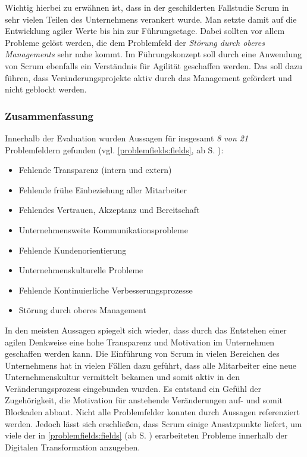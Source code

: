 Wichtig hierbei zu erwähnen ist, dass in der geschilderten Fallstudie Scrum in sehr vielen Teilen des Unternehmens verankert wurde. Man setzte damit auf die Entwicklung agiler Werte bis hin zur Führungsetage. Dabei sollten vor allem Probleme gelöst werden, die dem Problemfeld der \textit{Störung durch oberes Managements} sehr nahe kommt. Im Führungskonzept soll durch eine Anwendung von Scrum ebenfalls ein Verständnis für Agilität geschaffen werden. Das soll dazu führen, dass Veränderungsprojekte aktiv durch das Management gefördert und nicht geblockt werden.

\subsubsection{Zusammenfassung}

Innerhalb der Evaluation wurden Aussagen für insgesamt \textit{8 von 21} Problemfeldern gefunden (vgl. \ref{problemfields:fields}, ab S. \pageref{problemfields:fields}):

\begin{itemize}[noitemsep, topsep=0pt]
	\item Fehlende Transparenz (intern und extern)
	\item Fehlende frühe Einbeziehung aller Mitarbeiter
	\item Fehlendes Vertrauen, Akzeptanz und Bereitschaft
	\item Unternehmensweite Kommunikationsprobleme
	\item Fehlende Kundenorientierung
	\item Unternehmenskulturelle Probleme
	\item Fehlende Kontinuierliche Verbesserungsprozesse
	\item Störung durch oberes Management
\end{itemize}

In den meisten Aussagen spiegelt sich wieder, dass durch das Entstehen einer agilen Denkweise eine hohe Transparenz und Motivation im Unternehmen geschaffen werden kann. Die Einführung von Scrum in vielen Bereichen des Unternehmens hat in vielen Fällen dazu geführt, dass alle Mitarbeiter eine neue Unternehmenskultur vermittelt bekamen und somit aktiv in den Veränderungsprozess eingebunden wurden. Es entstand ein Gefühl der Zugehörigkeit, die Motivation für anstehende Veränderungen auf- und somit Blockaden abbaut. Nicht alle Problemfelder konnten durch Aussagen referenziert werden. Jedoch lässt sich erschließen, dass Scrum einige Ansatzpunkte liefert, um viele der in \ref{problemfields:fields} (ab S. \pageref{problemfields:fields}) erarbeiteten Probleme innerhalb der Digitalen Transformation anzugehen.


